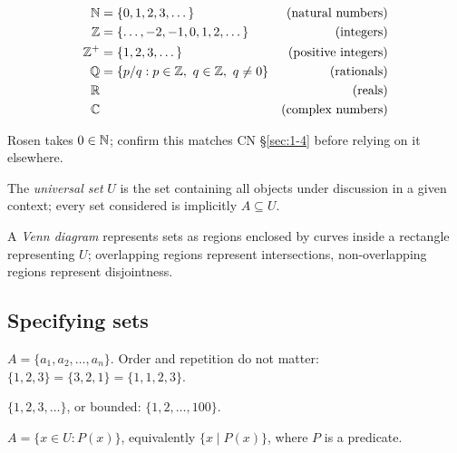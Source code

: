 \documentclass[11pt]{article}
\begin{document}
\begin{definition}
\begin{align*}
\mathbb{N} &= \{0,1,2,3,\dots\} & \text{(natural numbers)}\\
\mathbb{Z} &= \{\dots,-2,-1,0,1,2,\dots\} & \text{(integers)}\\
\mathbb{Z}^+ &= \{1,2,3,\dots\} & \text{(positive integers)}\\
\mathbb{Q} &= \{p/q : p \in \mathbb{Z},\ q \in \mathbb{Z},\ q \neq 0\} & \text{(rationals)}\\
\mathbb{R} &&\text{(reals)}\\
\mathbb{C} &&\text{(complex numbers)}
\end{align*}
\end{definition}

\begin{note}
Rosen takes $0 \in \mathbb{N}$; confirm this matches CN \S\ref{sec:1-4} before relying on it elsewhere.
\end{note}

\begin{definition}
The \emph{universal set} $U$ is the set containing all objects under discussion in a given context; every set considered is implicitly $A \subseteq U$.
\end{definition}

\begin{definition}
A \emph{Venn diagram} represents sets as regions enclosed by curves inside a rectangle representing $U$; overlapping regions represent intersections, non-overlapping regions represent disjointness.
\end{definition}

\subsection{Specifying sets}
\label{sec:1-2}
\begin{definition}
$A = \{a_1, a_2, \dots, a_n\}$. Order and repetition do not matter: $\{1,2,3\} = \{3,2,1\} = \{1,1,2,3\}$.
\end{definition}

\begin{definition}
$\{1,2,3,\dots\}$, or bounded: $\{1,2,\dots,100\}$.
\end{definition}

\begin{definition}
$A = \{x \in U : P(x)\}$, equivalently $\{x \mid P(x)\}$, where $P$ is a predicate.
\end{definition}
\end{document}
